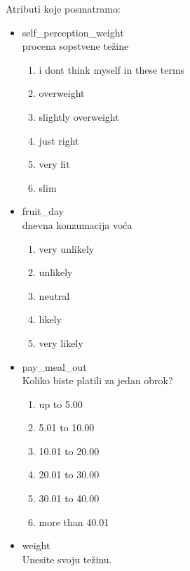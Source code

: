 \documentclass[12pt,a4paper]{article}
\begin{document}
Atributi koje posmatramo:
\begin{itemize}
  \item self\_perception\_weight\\
    procena sopstvene te\v zine
    \begin{enumerate}
        \item i dont think myself in these terms 
        \item overweight 
        \item slightly overweight 
        \item just right 
        \item very fit 
        \item slim 
    \end{enumerate}
  \item fruit\_day\\
    dnevna konzumacija vo\' ca
    \begin{enumerate}
        \item very unlikely
        \item unlikely 
        \item neutral 
        \item likely 
        \item very likely 
    \end{enumerate}
  \item pay\_meal\_out\\
    Koliko biste platili za jedan obrok?
    \begin{enumerate}
        \item up to 5.00
        \item 5.01 to 10.00 
        \item 10.01 to 20.00    
        \item 20.01 to 30.00
        \item 30.01 to 40.00 
        \item more than 40.01 
   \end{enumerate}
   \item weight\\
     Unesite svoju te\v zinu.
\end{itemize}
\end{document}
